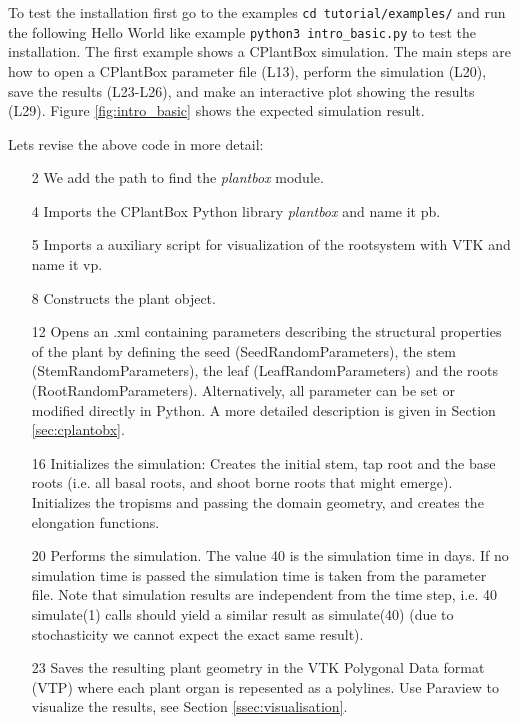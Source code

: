 To test the installation first go to the examples \lstinline{cd tutorial/examples/} and run the following Hello World like example \lstinline{python3 intro_basic.py} to test the installation. The first example shows a CPlantBox simulation. The main steps are how to open a CPlantBox parameter file (L13), perform the simulation (L20), save the results (L23-L26), and make an interactive plot showing the results (L29). Figure \ref{fig:intro_basic} shows the expected simulation result.  

 

\noindent 
Lets revise the above code in more detail: 
\begin{itemize}
 \item[2] We add the path to find the \emph{plantbox} module.
 \item[4] Imports the CPlantBox Python library \emph{plantbox} and name it pb.
 \item[5] Imports a auxiliary script for visualization of the rootsystem with VTK and name it vp.
 \item[8] Constructs the plant object.
 \item[12] Opens an .xml containing parameters describing the structural properties of the plant by defining the seed (SeedRandomParameters), the stem (StemRandomParameters), the leaf (LeafRandomParameters) and the roots (RootRandomParameters). Alternatively, all parameter can be set or modified directly in Python. A more detailed description is given in Section \ref{sec:cplantobx}.
 \item[16] Initializes the simulation: Creates the initial stem, tap root and the base roots
 (i.e. all basal roots, and shoot borne roots that might emerge). Initializes the tropisms and passing the domain geometry, 
 and creates the elongation functions. 
 \item[20] Performs the simulation. The value 40 is the simulation time in days. If no simulation time is passed the simulation time is taken from the parameter file. Note that simulation results are independent from the time step, i.e. 40 simulate(1) calls should yield a similar result 
 as simulate(40) (due to stochasticity we cannot expect the exact same result). 
 \item[23] Saves the resulting plant geometry in the VTK Polygonal Data format (VTP) where each plant organ is repesented as a polylines. Use Paraview to visualize the results, see Section \ref{ssec:visualisation}.

\end{itemize}
